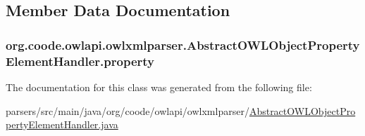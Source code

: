\subsection{Member Data Documentation}
\hypertarget{classorg_1_1coode_1_1owlapi_1_1owlxmlparser_1_1_abstract_o_w_l_object_property_element_handler_abba8dd1e5368df58498990b1d16fce13}{
\subsubsection[{property}]{ org.\-coode.\-owlapi.\-owlxmlparser.\-Abstract\-O\-W\-L\-Object\-Property\-Element\-Handler.\-property\hspace{0.3cm}{\ttfamily [private]}}}\label{classorg_1_1coode_1_1owlapi_1_1owlxmlparser_1_1_abstract_o_w_l_object_property_element_handler_abba8dd1e5368df58498990b1d16fce13}


The documentation for this class was generated from the following file\-:\begin{DoxyCompactItemize}
\item 
parsers/src/main/java/org/coode/owlapi/owlxmlparser/\hyperlink{_abstract_o_w_l_object_property_element_handler_8java}{Abstract\-O\-W\-L\-Object\-Property\-Element\-Handler.\-java}\end{DoxyCompactItemize}
